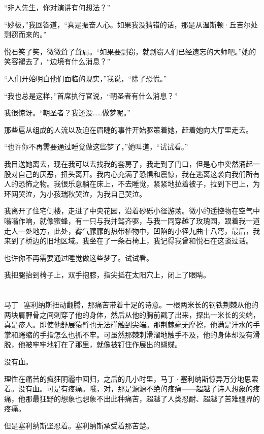 \documentclass[AutoFakeBold=true]{book}
\begin{document}
``非人先生，你对演讲有何想法？''

``妙极，''我回答道，``真是振奋人心。如果我没猜错的话，那是从温斯顿·丘吉尔处剽窃而来的。''

悦石笑了笑，微微耸了耸肩。``如果要剽窃，就剽窃人们已经遗忘的大师吧。''她的笑容褪去了，``边境有什么消息？''

``人们开始明白他们面临的现实，''我说，``除了恐慌。''

``我也总是这样，''首席执行官说，``朝圣者有什么消息？''

我很惊讶。``朝圣者？我还没……做梦呢。''

那些扈从组成的人流以及迫在眉睫的事件开始驱策着她，赶着她向大厅里走去。

``也许你不再需要通过睡觉做这些梦了，''她叫道，``试试看。''

我目送她离去，现在我可以去找我的套房了，我走到了门口，但是心中突然涌起一股对自己的厌恶，扭头离开。我内心充满了恐惧和震惊，我在逃离这袭向我们所有人的恐怖之物。我很乐意躺在床上，不去睡觉，紧紧地拉着被子，拉到下巴上，为环网哭泣，为小孩瑞秋哭泣，为我自己哭泣。

我离开了住宅侧楼，走进了中央花园，沿着砂砾小径游荡。微小的遥控物在空气中嗡嗡作响，就像蜜蜂，有一只与我并驾齐驱，与我一同穿越了玫瑰园，跟着我一道走人一处地方，此处，雾气朦朦的热带植物中，凹陷的小径九曲十八弯，最后，我来到了桥边的旧地区域。我坐在了一条石椅上，我记得我曾和悦石在这谈过话。

{\kaishu 也许你不再需要通过睡觉做这些梦了。试试看。}

我把腿抬到椅子上，双手抱膝，指尖抵在太阳穴上，闭上了眼睛。

\chapter{}

马丁·塞利纳斯扭动翻腾，那痛苦带着十足的诗意。一根两米长的钢铁荆棘从他的两块肩胛骨之间刺穿了他的身体，然后从他的胸前戳了出来，探出一米长的尖端，真是疹人。即使他舒展猿臂也无法碰触到尖端。那荆棘毫无摩擦，他满是汗水的手掌和蜷缩的手指怎么也抓不牢。可虽然那棘刺滑溜地触手不及，他的身体却没有滑脱，他被牢牢地钉在了那里，就像被钉住作展出的蝴蝶。

没有血。

理性在痛苦的疯狂阴霾中回归，之后的几小时里，马丁·塞利纳斯惊异万分地思索着。没有血。可是有疼痛。哦，对，那是源源不绝的疼痛——超越了诗人想象的疼痛，他那最狂野的想象也想象不出此种痛苦，超越了人类忍耐、超越了苦难疆界的疼痛。

但是塞利纳斯坚忍着。塞利纳斯承受着那苦楚。
\end{document}
